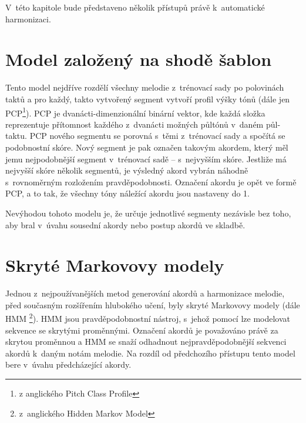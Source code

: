 V~této kapitole bude představeno několik přístupů právě k~automatické harmonizaci.

\section{Model založený na shodě šablon}
\label{shodaSablon}
Tento model nejdříve rozdělí všechny melodie z~trénovací sady po polovinách taktů 
a pro každý, takto vytvořený segment vytvoří profil výšky tónů 
(dále jen PCP\footnote{z anglického Pitch Class Profile}).
\cite{YinCheng_comparativeStudy}
PCP je dvanácti-dimenzionální binární vektor, 
kde každá složka reprezentuje přítomnost 
každého z~dvanácti možných půltónů v~daném půl-taktu.
\cite{fujishima}
PCP nového segmentu se porovná s~těmi z~trénovací sady
a spočítá se podobnostní skóre.
Nový segment je pak označen takovým akordem,
který měl jemu nejpodobnější segment v~trénovací sadě -- s~nejvyšším skóre.
Jestliže má nejvyšší skóre několik segmentů,
je výsledný akord vybrán náhodně s~rovnoměrným rozložením pravděpodobnosti.
Označení akordu je opět ve formě PCP, a to tak,
že všechny tóny náležící akordu jsou nastaveny do 1.
\par

Nevýhodou tohoto modelu je, že určuje jednotlivé segmenty nezávisle bez toho,
aby bral v~úvahu sousední akordy nebo postup akordů ve skladbě.
\cite{YinCheng_comparativeStudy}

\section{Skryté Markovovy modely}
Jednou z~nejpoužívanějších metod generování akordů a harmonizace melodie, 
před současným rozšířením hlubokého učení, byly skryté Markovovy modely 
(dále HMM \footnote{z~anglického Hidden Markov Model}).
HMM jsou pravděpodobnostní nástroj, 
s~jehož pomocí lze modelovat sekvence se skrytými proměnnými.
Označení akordů je považováno právě za skrytou proměnnou a 
HMM se snaží odhadnout nejpravděpodobnější sekvenci akordů
k~daným notám melodie.
Na rozdíl od předchozího přístupu 
tento model bere v~úvahu předcházející akordy.
\cite{YinCheng_comparativeStudy}

